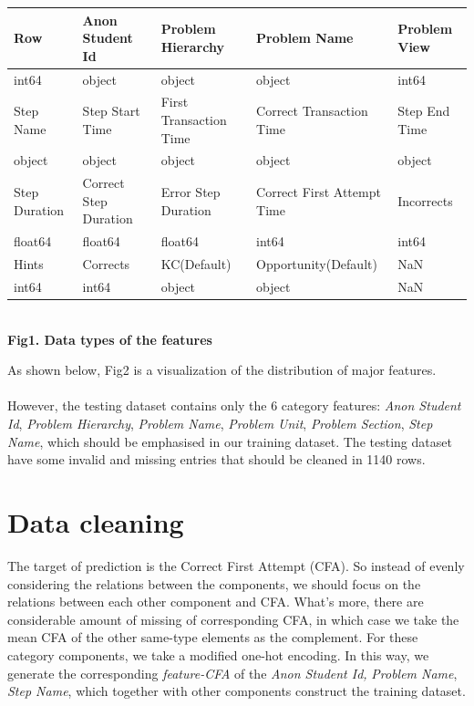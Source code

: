 \documentclass{article}
\begin{document}
\begin{center} 
\centering
\begin{tabular}{|l|l|l|l|l|}
\hline 
Row&Anon Student Id&Problem Hierarchy&Problem Name &Problem View\\
\hline  
int64 & object & object & object & int64 \\
\hline 
Step Name& Step Start Time &First Transaction Time &Correct Transaction Time&Step End Time\\
\hline  
object & object & object & object & object \\
\hline 
Step Duration& Correct Step Duration &Error Step Duration &Correct First Attempt Time&Incorrects\\
\hline  
float64 & float64 & float64 & int64 & int64 \\
\hline 
Hints& Corrects &KC(Default) &Opportunity(Default) &NaN\\
\hline  
int64 & int64 & object & object & NaN \\
\hline 
\end{tabular}\\
\textbf{Fig1. Data types of the features}\\
\end{center}
As shown below, Fig2 is a visualization of the distribution of major features.\\\\
However, the testing dataset contains only the 6 category features: \textit{Anon Student Id}, \textit{Problem Hierarchy}, \textit{Problem Name}, \textit{Problem Unit}, \textit{Problem Section}, \textit{Step Name}, which should be emphasised in our training dataset. The testing dataset have some invalid and  missing entries that should be cleaned in 1140 rows.\\

\section{Data cleaning}
The target of prediction is the Correct First Attempt (CFA). So instead of evenly considering the relations between the components, we should focus on the relations between each other component and CFA. What's more, there are considerable amount of missing of corresponding CFA, in which case we take the mean CFA of the other same-type elements as the complement. For these category components, we take a modified one-hot encoding. In this way, we generate the corresponding \textit{feature-CFA} of the \textit{Anon Student Id,} \textit{Problem Name}, \textit{Step Name}, which together with other components construct the training dataset.\\
\end{document}
